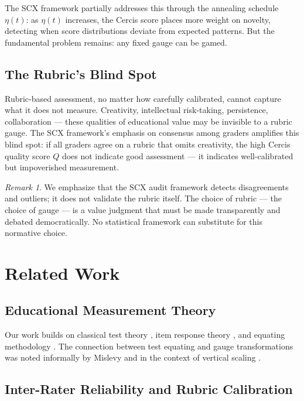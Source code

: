 \documentclass[12pt,a4paper]{article}
\theoremstyle{remark}
\newtheorem{remark}[theorem]{Remark}
\begin{document}
The SCX framework partially addresses this through the annealing schedule $\eta(t)$: as $\eta(t)$ increases, the Cercis score places more weight on novelty, detecting when score distributions deviate from expected patterns. But the fundamental problem remains: any fixed gauge can be gamed.

\subsection{The Rubric's Blind Spot}

Rubric-based assessment, no matter how carefully calibrated, cannot capture what it does not measure. Creativity, intellectual risk-taking, persistence, collaboration --- these qualities of educational value may be invisible to a rubric gauge. The SCX framework's emphasis on consensus among graders amplifies this blind spot: if all graders agree on a rubric that omits creativity, the high Cercis quality score $Q$ does not indicate good assessment --- it indicates well-calibrated but impoverished measurement.

\begin{remark}
We emphasize that the SCX audit framework detects disagreements and outliers; it does not validate the rubric itself. The choice of rubric --- the choice of gauge --- is a value judgment that must be made transparently and debated democratically. No statistical framework can substitute for this normative choice.
\end{remark}

\section{Related Work}

\subsection{Educational Measurement Theory}

Our work builds on classical test theory \cite{lord1968, guttman1944}, item response theory \cite{rasch1960, birnbaum1968}, and equating methodology \cite{kolen2004, holland1986}. The connection between test equating and gauge transformations was noted informally by Mislevy \cite{mislevy1992} and in the context of vertical scaling \cite{patz1999}.

\subsection{Inter-Rater Reliability and Rubric Calibration}
\end{document}
